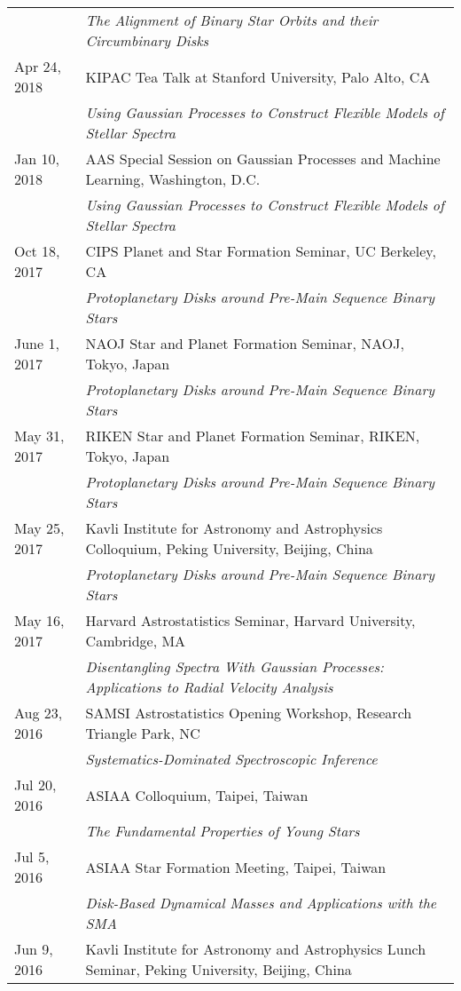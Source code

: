 \begin{longtable}{@{\hspace{10pt}}p{1.2in}l}
  & \emph{The Alignment of Binary Star Orbits and their Circumbinary Disks} \\[\rowskip]
  Apr 24, 2018 & KIPAC Tea Talk at Stanford University, Palo Alto, CA \\
  & \emph{Using Gaussian Processes to Construct Flexible Models of Stellar Spectra} \\[\rowskip]
  Jan 10, 2018 & AAS Special Session on Gaussian Processes and Machine Learning, Washington, D.C. \\
  & \emph{Using Gaussian Processes to Construct Flexible Models of Stellar Spectra}\\[\rowskip]
  Oct 18, 2017 & CIPS Planet and Star Formation Seminar, UC Berkeley, CA \\
  & \emph{Protoplanetary Disks around Pre-Main Sequence Binary Stars} \\[\rowskip]
  June 1, 2017 & NAOJ Star and Planet Formation Seminar, NAOJ, Tokyo, Japan \\
  & \emph{Protoplanetary Disks around Pre-Main Sequence Binary Stars} \\[\rowskip]
  May 31, 2017 & RIKEN Star and Planet Formation Seminar, RIKEN, Tokyo, Japan \\
  & \emph{Protoplanetary Disks around Pre-Main Sequence Binary Stars} \\[\rowskip]
  May 25, 2017 & Kavli Institute for Astronomy and Astrophysics Colloquium, Peking University, Beijing, China \\
  & \emph{Protoplanetary Disks around Pre-Main Sequence Binary Stars} \\[\rowskip]
  May 16, 2017 & Harvard Astrostatistics Seminar, Harvard University, Cambridge, MA \\
  & \emph{Disentangling Spectra With Gaussian Processes: Applications to Radial Velocity Analysis} \\[\rowskip]
  Aug 23, 2016 & SAMSI Astrostatistics Opening Workshop, Research Triangle Park, NC \\
  & \emph{Systematics-Dominated Spectroscopic Inference} \\[\rowskip]
  Jul 20, 2016 & ASIAA Colloquium, Taipei, Taiwan \\
  & \emph{The Fundamental Properties of Young Stars} \\[\rowskip]
  Jul 5, 2016 & ASIAA Star Formation Meeting, Taipei, Taiwan \\
  & \emph{Disk-Based Dynamical Masses and Applications with the SMA} \\[\rowskip]
  Jun 9, 2016 & Kavli Institute for Astronomy and Astrophysics Lunch Seminar, Peking University, Beijing, China \\

\end{longtable}

